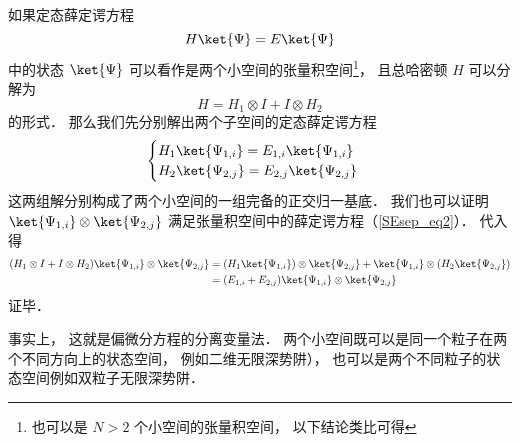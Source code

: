 
如果定态薛定谔方程
\begin{equation}\label{SEsep_eq2}
H \ket{\Psi} = E \ket{\Psi}
\end{equation}
中的状态 $\ket{\Psi}$ 可以看作是两个小空间的张量积空间\footnote{也可以是 $N > 2$ 个小空间的张量积空间， 以下结论类比可得}， 且总哈密顿 $H$ 可以分解为
\begin{equation}\label{SEsep_eq1}
H = H_1 \otimes I + I \otimes H_2
\end{equation}
的形式． 那么我们先分别解出两个子空间的定态薛定谔方程
\begin{equation}
\begin{cases}
H_1 \ket{\Psi_{1,i}} = E_{1,i} \ket{\Psi_{1,i}}\\
H_2 \ket{\Psi_{2,j}} = E_{2,j} \ket{\Psi_{2,j}}
\end{cases}
\end{equation}
这两组解分别构成了两个小空间的一组完备的正交归一基底． 我们也可以证明 $\ket{\Psi_{1,i}} \otimes \ket{\Psi_{2,j}}$ 满足张量积空间中的薛定谔方程（\autoref{SEsep_eq2}）． 代入得
\begin{equation}
\begin{aligned}
(H_1 \otimes I + I \otimes H_2) \ket{\Psi_{1,i}} \otimes \ket{\Psi_{2,j}} &= (H_1 \ket{\Psi_{1,i}}) \otimes \ket{\Psi_{2,j}} +  \ket{\Psi_{1,i}} \otimes (H_2 \ket{\Psi_{2,j}})\\
&= (E_{1,i} + E_{2, j}) \ket{\Psi_{1,i}} \otimes \ket{\Psi_{2,j}}
\end{aligned}
\end{equation}
证毕．

事实上， 这就是偏微分方程的分离变量法． 两个小空间既可以是同一个粒子在两个不同方向上的状态空间， 例如二维无限深势阱）， 也可以是两个不同粒子的状态空间例如双粒子无限深势阱．%
